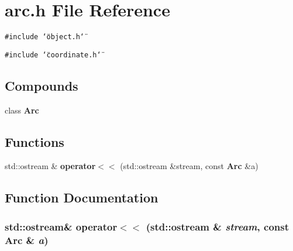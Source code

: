 \section{arc.h File Reference}
\label{arc_8h}
{\tt \#include \char`\"{}object.h\char`\"{}}\par
{\tt \#include \char`\"{}coordinate.h\char`\"{}}\par
\subsection*{Compounds}
\begin{CompactItemize}
\item 
class {\bf Arc}
\end{CompactItemize}
\subsection*{Functions}
\begin{CompactItemize}
\item 
std::ostream \& {\bf operator$<$$<$} (std::ostream \&stream, const {\bf Arc} \&a)
\end{CompactItemize}


\subsection{Function Documentation}
\subsubsection{\setlength{\rightskip}{0pt plus 5cm}std::ostream\& operator$<$$<$ (std::ostream \& {\em stream}, const {\bf Arc} \& {\em a})\hspace{0.3cm}{\tt  [inline]}}\label{arc_8h_a0}


